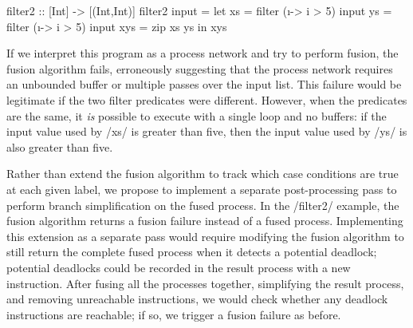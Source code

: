 \begin{haskell}
filter2 :: [Int] -> [(Int,Int)]
filter2 input =
 let xs  = filter (\i -> i > 5) input
     ys  = filter (\i -> i > 5) input
     xys = zip xs ys
 in  xys
\end{haskell}

If we interpret this program as a process network and try to perform fusion, the fusion algorithm fails, erroneously suggesting that the process network requires an unbounded buffer or multiple passes over the input list.
This failure would be legitimate if the two filter predicates were different.
However, when the predicates are the same, it \emph{is} possible to execute with a single loop and no buffers: if the input value used by \Hs/xs/ is greater than five, then the input value used by \Hs/ys/ is also greater than five.

Rather than extend the fusion algorithm to track which case conditions are true at each given label, we propose to implement a separate post-processing pass to perform branch simplification on the fused process.
In the \Hs/filter2/ example, the fusion algorithm returns a fusion failure instead of a fused process.
Implementing this extension as a separate pass would require modifying the fusion algorithm to still return the complete fused process when it detects a potential deadlock; potential deadlocks could be recorded in the result process with a new instruction.
After fusing all the processes together, simplifying the result process, and removing unreachable instructions, we would check whether any deadlock instructions are reachable; if so, we trigger a fusion failure as before.

